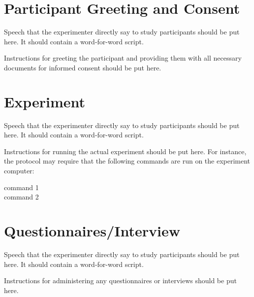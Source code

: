\documentclass{study}
\begin{document}
\newpage
\section*{Participant Greeting and Consent}

\begin{speak}
  Speech that the experimenter directly say to study participants should be put here. It should contain a word-for-word script.
\end{speak}

\begin{instruction}
  Instructions for greeting the participant and providing them with all necessary documents for informed consent should be put here.
\end{instruction}

\newpage
\section*{Experiment}
\begin{speak}
  Speech that the experimenter directly say to study participants should be put here. It should contain a word-for-word script.
\end{speak}

\begin{instruction}
  Instructions for running the actual experiment should be put here. For instance, the protocol may require that the following commands are run on the experiment computer:
\end{instruction}

\begin{command}
    command 1\\
    command 2
\end{command}

\newpage
\section*{Questionnaires/Interview}
\begin{speak}
  Speech that the experimenter directly say to study participants should be put here. It should contain a word-for-word script.
\end{speak}

\begin{instruction}
  Instructions for administering any questionnaires or interviews should be put here.
\end{instruction}
\end{document}

